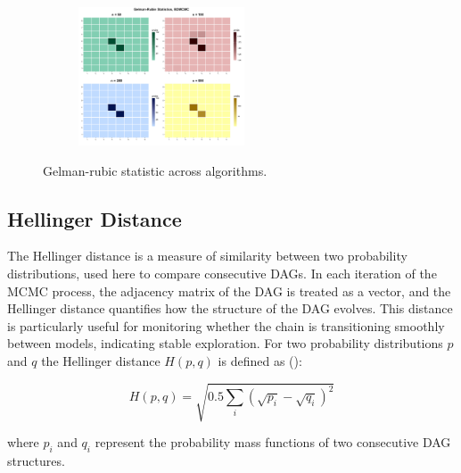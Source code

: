 \documentclass{report}
\begin{document}
\begin{figure}[!ht]
{\begin{minipage}{\textwidth}
			\begin{subfigure}[b]{0.45\textwidth}   
				\centering
				\includegraphics[height=4.1cm]{Figures/Diagnostic/gelmanRubic_BDMCMC.png}
				\label{fig:gelmanr-bd}
			\end{subfigure}
		\end{minipage}
	}
	\caption{Gelman-rubic statistic across algorithms.}
	\label{fig:gelman-rubic}
\end{figure}

\subsection{Hellinger Distance}

The Hellinger distance is a measure of similarity between two probability distributions, used here to compare consecutive DAGs. In each iteration of the MCMC process, the adjacency matrix of the DAG is treated as a vector, and the Hellinger distance quantifies how the structure of the DAG evolves. This distance is particularly useful for monitoring whether the chain is transitioning smoothly between models, indicating stable exploration. For
two probability distributions $p$ and $q$ the Hellinger distance $H(p,q)$ is defined as (\citet{boone2014hellinger}):

$$
H(p,q) = \sqrt{0.5 \sum_{i} (\sqrt{p_i} - \sqrt{q_i})^2}
$$

where $p_i$ and $q_i$ represent the probability mass functions of two consecutive DAG structures.
\end{document}
